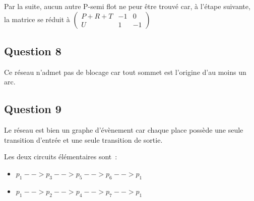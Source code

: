 Par la suite, aucun autre P-semi flot ne peur être trouvé car, à
l'étape suivante, la matrice se réduit à
$ \begin{pmatrix}
P+R+T&-1&0 \\
U&1&-1
\end{pmatrix}$
\subsection{Question 8}
Ce réseau n'admet pas de blocage car tout sommet est l'origine d'au
moins un arc.
\subsection{Question 9}
Le réseau est bien un graphe d'évènement car chaque place possède une
seule transition d'entrée et une seule transition de sortie.

Les deux circuits élémentaires sont~:
\begin{itemize}
\item $p_1 -->p_3 --> p_5 --> p_6 --> p_1$
\item $p_1 --> p_2 --> p_4 --> p_7 --> p_1$
\end{itemize}

